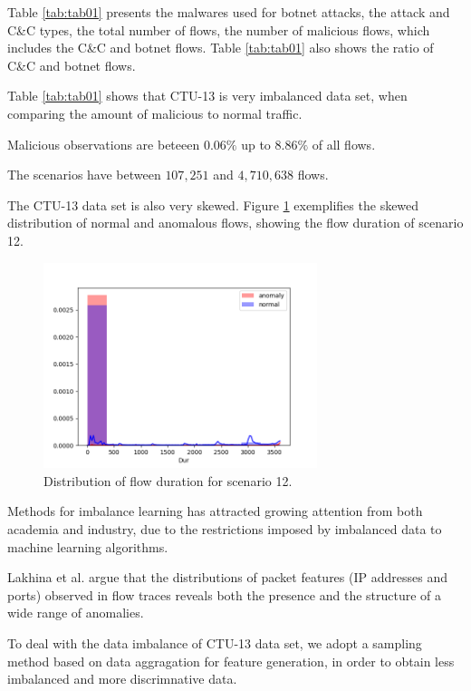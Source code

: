 \documentclass[review]{elsarticle}
\begin{document}
Table \ref{tab:tab01} presents the malwares used for botnet attacks, the attack and C\&C types, the total number of flows, the number of malicious flows, which includes the C\&C and botnet flows. Table \ref{tab:tab01} also shows the ratio of C\&C and botnet flows.

Table \ref{tab:tab01} shows that CTU-13 is very imbalanced data set, when comparing the amount of malicious to normal traffic.

Malicious observations are beteeen $0.06\%$ up to $8.86\%$ of all flows.

The scenarios have between $107,251$ and $4,710,638$ flows.

The CTU-13 data set is also very skewed. Figure \ref{fig:fig06} exemplifies the skewed distribution of normal and anomalous flows, showing the flow duration of scenario 12.

\begin{figure}[h!]
     \centering
     \includegraphics[width=8cm]{figures/raw_distplot_capture20110812_Dur.png}
     \caption{Distribution of flow duration for scenario 12.}
     \label{fig:fig06}
\end{figure}
	
Methods for imbalance learning has attracted growing attention from both academia and industry, due to the restrictions imposed by imbalanced data to machine learning algorithms.





Lakhina et al. \cite{lakhina2005mining} argue that the distributions of packet features (IP addresses and ports) observed in flow traces reveals both the presence and the structure of a wide range of anomalies.

To deal with the data imbalance of CTU-13 data set, we adopt a sampling method based on data aggragation \cite{acarali2016survey} for feature generation, in order to obtain less imbalanced and more discrimnative data.	
\end{document}
